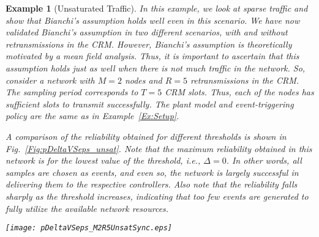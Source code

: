 \documentclass[journal]{IEEEtran}
\newtheorem{example}{Example}[section]
\begin{document}
\begin{example}[Unsaturated Traffic] \label{Ex:Unsat}
In this example, we look at sparse traffic and show that Bianchi's assumption holds well even in this scenario. We have now validated Bianchi's assumption in two different scenarios, with and without retransmissions in the CRM. However, Bianchi's assumption is theoretically motivated by a mean field analysis. Thus, it is important to ascertain that this assumption holds just as well when there is not much traffic in the network. So, consider a network with $M=2$ nodes and $R=5$ retransmissions in the CRM. The sampling period corresponds to $T=5$ CRM slots. Thus, each of the nodes has sufficient slots to transmit successfully. The plant model and event-triggering policy are the same as in Example~\ref{Ex:Setup}.

A comparison of the reliability obtained for different thresholds is shown in Fig.~\ref{Fig:pDeltaVSeps_unsat}. Note that the maximum reliability obtained in this network is for the lowest value of the threshold, i.e., $\Delta=0$. In other words, all samples are chosen as events, and even so, the network is largely successful in delivering them to the respective controllers. Also note that the reliability falls sharply as the threshold increases, indicating that too few events are generated to fully utilize the available network resources.

\begin{figure*}[tb]
\begin{center}
\texttt{[image: pDeltaVSeps\_M2R5UnsatSync.eps]}
\caption{A comparison of the analytical and simulated values of the reliability versus the scheduler threshold, with unsaturated traffic. There are just $2$ nodes in the network and the CRM permits $5$ retransmissions. Even so, Bianchi's assumption seems to hold, indicating that this is a good approximation of unsaturated and saturated network conditions.} \label{Fig:pDeltaVSeps_unsat}
\end{center}
\end{figure*}
\end{example}
\end{document}
